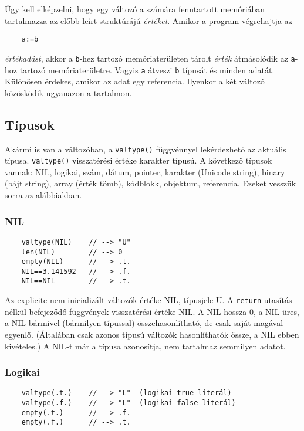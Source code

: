 Úgy kell elképzelni, hogy egy változó a számára fenntartott memóriában
tartalmazza az előbb leírt struktúrájú {\em értéket}. Amikor a program
végrehajtja az 

\begin{verbatim}
    a:=b
\end{verbatim}
{\em értékadást}, akkor a \verb!b!-hez tartozó memóriaterületen tárolt {\em érték\/}
átmásolódik az \verb!a!-hoz tartozó memóriaterületre. Vagyis \verb!a! átveszi 
\verb!b! típusát és minden adatát.  Különösen érdekes, amikor az adat egy referencia.
Ilyenkor a két változó közösködik ugyanazon a tartalmon.


\subsection{Típusok}

Akármi is van a változóban,
a \verb!valtype()! függvénnyel lekérdezhető az aktuális típusa. 
\verb!valtype()! visszatérési értéke karakter típusú. 
A következő típusok vannak: 
NIL, logikai, szám, dátum, pointer, karakter (Unicode string),
binary (bájt string), array (érték tömb), kódblokk, objektum, referencia. 
Ezeket vesszük sorra az alábbiakban.


\subsubsection{NIL}
\begin{verbatim}
    valtype(NIL)    // --> "U"
    len(NIL)        // --> 0
    empty(NIL)      // --> .t.
    NIL==3.141592   // --> .f.
    NIL==NIL        // --> .t.
\end{verbatim}

Az explicite nem inicializált változók értéke NIL, típusjele U.
A \verb!return! utasítás nélkül befejeződő függvények visszatérési
értéke NIL. A NIL hossza 0, a NIL üres, a NIL bármivel (bármilyen típussal)  
összehasonlítható, de csak saját magával egyenlő. (Általában
csak azonos típusú változók hasonlíthatók össze, a NIL ebben kivételes.)
A NIL-t már a típusa azonosítja, nem tartalmaz semmilyen adatot.


\subsubsection{Logikai}
\begin{verbatim}
    valtype(.t.)    // --> "L"  (logikai true literál)
    valtype(.f.)    // --> "L"  (logikai false literál)
    empty(.t.)      // --> .f.
    empty(.f.)      // --> .t.
\end{verbatim}


